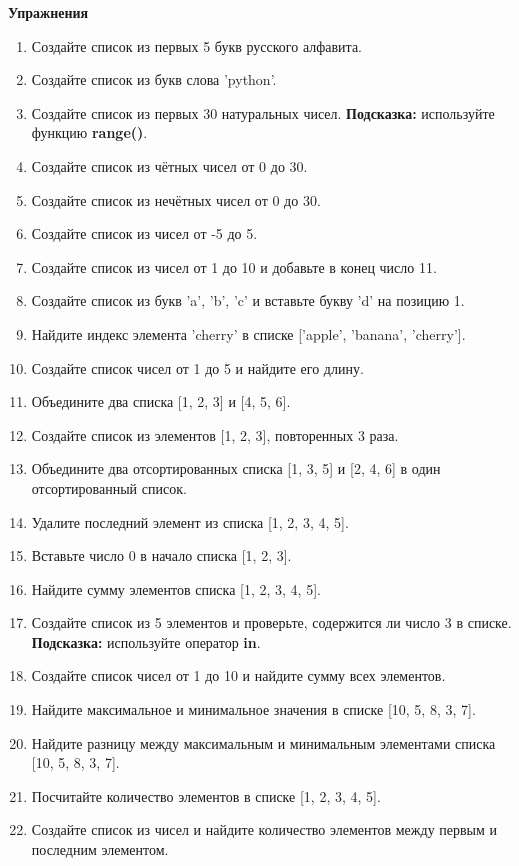 \documentclass[a4,12pt]{article}
\theoremstyle{remark}
\begin{document}
\textbf{Упражнения}
\begin{enumerate}
    \item Создайте список из первых 5 букв русского алфавита.
    \item Создайте список из букв слова 'python'.
    \item Создайте список из первых 30 натуральных чисел. \textbf{Подсказка:} используйте функцию \textbf{range()}.
    \item Создайте список из чётных чисел от 0 до 30.
    \item Создайте список из нечётных чисел от 0 до 30.
    \item Создайте список из чисел от -5 до 5.
    \item Создайте список из чисел от 1 до 10 и добавьте в конец число 11.
    \item Создайте список из букв 'a', 'b', 'c' и вставьте букву 'd' на позицию 1.
    \item Найдите индекс элемента 'cherry' в списке ['apple', 'banana', 'cherry'].
    \item Создайте список чисел от 1 до 5 и найдите его длину.
    \item Объедините два списка [1, 2, 3] и [4, 5, 6].
    \item Создайте список из элементов [1, 2, 3], повторенных 3 раза.
    \item Объедините два отсортированных списка [1, 3, 5] и [2, 4, 6] в один отсортированный список.
    \item Удалите последний элемент из списка [1, 2, 3, 4, 5].
    \item Вставьте число 0 в начало списка [1, 2, 3].
    \item Найдите сумму элементов списка [1, 2, 3, 4, 5].
    \item Создайте список из 5 элементов и проверьте, содержится ли число 3 в списке. \textbf{Подсказка:} используйте оператор \textbf{in}.
    \item Создайте список чисел от 1 до 10 и найдите сумму всех элементов.
    \item Найдите максимальное и минимальное значения в списке [10, 5, 8, 3, 7].
    \item Найдите разницу между максимальным и минимальным элементами списка [10, 5, 8, 3, 7].
    \item Посчитайте количество элементов в списке [1, 2, 3, 4, 5].
    \item Создайте список из чисел и найдите количество элементов между первым и последним элементом.

\end{enumerate}
\end{document}
